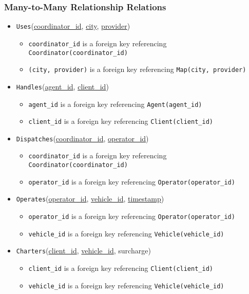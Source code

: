 \documentclass[12pt]{article}
\begin{document}
\subsubsection{Many-to-Many Relationship Relations}
\begin{itemize}
    \item \texttt{Uses}(\underline{coordinator\_id}, \underline{city}, \underline{provider})
    \begin{itemize}
        \item \texttt{coordinator\_id} is a foreign key referencing \texttt{Coordinator(coordinator\_id)}
        \item \texttt{(city, provider)} is a foreign key referencing \texttt{Map(city, provider)}
    \end{itemize}
    
    \item \texttt{Handles}(\underline{agent\_id}, \underline{client\_id})
    \begin{itemize}
        \item \texttt{agent\_id} is a foreign key referencing \texttt{Agent(agent\_id)}
        \item \texttt{client\_id} is a foreign key referencing \texttt{Client(client\_id)}
    \end{itemize}
    
    \item \texttt{Dispatches}(\underline{coordinator\_id}, \underline{operator\_id})
    \begin{itemize}
        \item \texttt{coordinator\_id} is a foreign key referencing \texttt{Coordinator(coordinator\_id)}
        \item \texttt{operator\_id} is a foreign key referencing \texttt{Operator(operator\_id)}
    \end{itemize}
    
    \item \texttt{Operates}(\underline{operator\_id}, \underline{vehicle\_id}, \underline{timestamp})
    \begin{itemize}
        \item \texttt{operator\_id} is a foreign key referencing \texttt{Operator(operator\_id)}
        \item \texttt{vehicle\_id} is a foreign key referencing \texttt{Vehicle(vehicle\_id)}
    \end{itemize}
    
    \item \texttt{Charters}(\underline{client\_id}, \underline{vehicle\_id}, surcharge)
    \begin{itemize}
        \item \texttt{client\_id} is a foreign key referencing \texttt{Client(client\_id)}
        \item \texttt{vehicle\_id} is a foreign key referencing \texttt{Vehicle(vehicle\_id)}
    \end{itemize}
    

\end{itemize}
\end{document}
